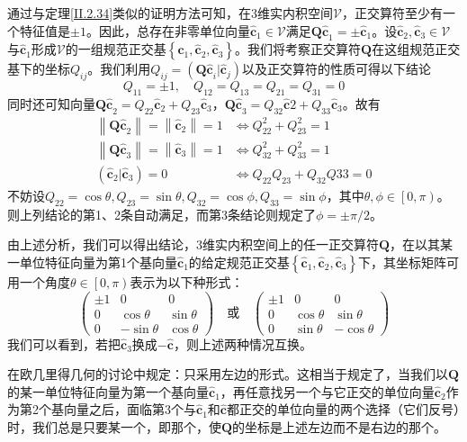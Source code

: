 \documentclass[main.tex]{subfiles}
\begin{document}
通过与定理\ref{II.2.34}类似的证明方法可知，在3维实内积空间$\mathcal{V}$，正交算符至少有一个特征值是$\pm 1$。因此，总存在非零单位向量$\mathbf{\hat{c}}_1\in\mathcal{V}$满足$\mathbf{Q\hat{c}}_1=\pm\mathbf{\hat{c}}_1$。设$\mathbf{\hat{c}}_2,\mathbf{\hat{c}}_3\in\mathcal{V}$与$\mathbf{\hat{c}}_1$形成$\mathcal{V}$的一组规范正交基$\left\{\mathbf{\hat{c}}_1,\mathbf{\hat{c}}_2,\mathbf{\hat{c}}_3\right\}$。我们将考察正交算符$\mathbf{Q}$在这组规范正交基下的坐标$Q_{ij}$。我们利用$Q_{ij}=\left(\mathbf{Q\hat{c}}_i|\mathbf{\hat{c}}_j\right)$以及正交算符的性质可得以下结论
\[Q_{11}=\pm 1,\quad Q_{12}=Q_{13}=Q_{21}=Q_{31}=0\]
同时还可知向量$\mathbf{Q\hat{c}}_2=Q_{22}\mathbf{\hat{c}}_2+Q_{23}\mathbf{\hat{c}}_3$，$\mathbf{Q\hat{c}}_3=Q_{32}\mathbf{\hat{c}}2+Q_{33}\mathbf{\hat{c}}_3$。故有
\begin{align*}
    \left\|\mathbf{Q\hat{c}}_2\right\|=\left\|\mathbf{\hat{c}}_2\right\|=1 & \Leftrightarrow Q_{22}^2+Q_{23}^2=1        \\
    \left\|\mathbf{Q\hat{c}}_3\right\|=\left\|\mathbf{\hat{c}}_3\right\|=1 & \Leftrightarrow Q_{32}^2+Q_{33}^2=1        \\
    \left(\mathbf{\hat{c}}_2|\mathbf{\hat{c}}_3\right)=0                   & \Leftrightarrow Q_{22}Q_{23}+Q_{32}Q{33}=0
\end{align*}
不妨设$Q_{22}=\cos\theta,Q_{23}=\sin\theta,Q_{32}=\cos\phi,Q_{33}=\sin\phi$，其中$\theta,\phi\in\left[0,\pi\right)$。则上列结论的第1、2条自动满足，而第3条结论则规定了$\phi=\pm\pi/2$。

由上述分析，我们可以得出结论，3维实内积空间上的任一正交算符$\mathbf{Q}$，在以其某一单位特征向量为第1个基向量$\mathbf{\hat{c}}_1$的给定规范正交基$\left\{\mathbf{\hat{c}}_1,\mathbf{\hat{c}}_2,\mathbf{\hat{c}}_3\right\}$下，其坐标矩阵可用一个角度$\theta\in\left[0,\pi\right)$表示为以下种形式：
\[
    \left(\begin{array}{ccc}\pm 1&0&0\\0&\cos\theta&\sin\theta\\0&-\sin\theta&\cos\theta\end{array}\right)\quad\text{或}\quad\left(\begin{array}{ccc}\pm 1&0&0\\0&\cos\theta&\sin\theta\\0&\sin\theta&-\cos\theta\end{array}\right)
\]
我们可以看到，若把$\mathbf{\hat{c}}_3$换成$-\mathbf{\hat{c}}$，则上述两种情况互换。

在欧几里得几何的讨论中规定：只采用左边的形式。这相当于规定了，当我们以$\mathbf{Q}$的某一单位特征向量为第一个基向量$\mathbf{\hat{c}}_1$，再任意找另一个与它正交的单位向量$\mathbf{\hat{c}}_2$作为第2个基向量之后，面临第3个与$\mathbf{\hat{c}}_1$和$\mathbf{\hat{c}}$都正交的单位向量的两个选择（它们反号）时，我们总是只要某一个，即那个，使$\mathbf{Q}$的坐标是上述左边而不是右边的那个。
\end{document}
